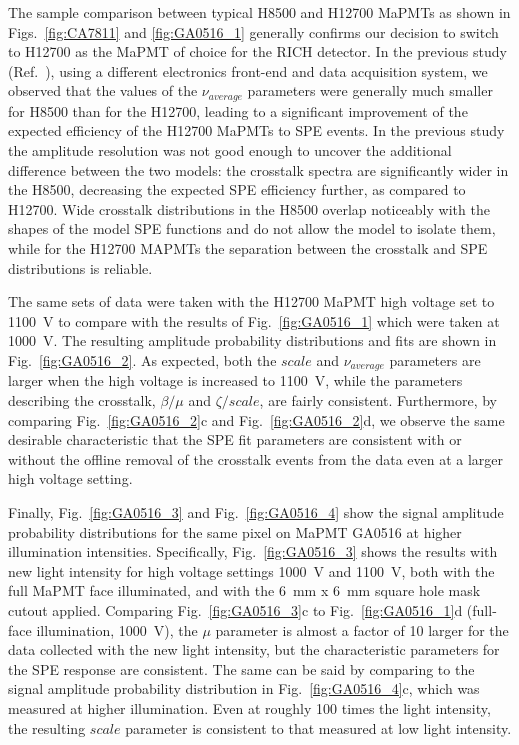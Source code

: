 The sample comparison between typical H8500 and H12700 MaPMTs as shown in Figs.~\ref{fig:CA7811} and \ref{fig:GA0516_1} generally confirms our decision to switch to H12700 as the MaPMT of choice for the RICH detector. In the previous study (Ref.~\cite{DEGTIARENKO20171}), using a different electronics front-end and data acquisition system, we observed that the values of the $\nu_{average}$ parameters were generally much smaller for H8500 than for the H12700, leading to a significant improvement of the expected efficiency of the H12700 MaPMTs to SPE events. In the previous study the amplitude resolution was not good enough to uncover the additional difference between the two models: the crosstalk spectra are significantly wider in the H8500, decreasing the expected SPE efficiency further, as compared to H12700. Wide crosstalk distributions in the H8500 overlap noticeably with the shapes of the model SPE functions and do not allow the model to isolate them, while for the H12700 MAPMTs the separation between the crosstalk and SPE distributions is reliable.  

The same sets of data were taken with the H12700 MaPMT high voltage set to 1100~V to compare with the results of Fig.~\ref{fig:GA0516_1} which were taken at 1000~V. 
The resulting amplitude probability distributions and fits are shown in Fig.~\ref{fig:GA0516_2}. 
As expected, both the $scale$ and $\nu_{average}$ parameters are larger when the high voltage is increased to 1100~V, while the parameters describing the crosstalk, $\beta/\mu$ and $\zeta/scale$, are fairly consistent. 
Furthermore, by comparing Fig.~\ref{fig:GA0516_2}c and Fig.~\ref{fig:GA0516_2}d, we observe the same desirable characteristic that the SPE fit parameters are consistent with or without the offline removal of the crosstalk events from the data even at a larger high voltage setting.


Finally, Fig.~\ref{fig:GA0516_3} and Fig.~\ref{fig:GA0516_4} show the signal amplitude probability distributions for the same pixel on MaPMT GA0516 at higher illumination intensities. 
Specifically, Fig.~\ref{fig:GA0516_3} shows the results with new light intensity for high voltage settings 1000~V and 1100~V, both with the full MaPMT face illuminated, and with the 6~mm x 6~mm square hole mask cutout applied. 
Comparing Fig.~\ref{fig:GA0516_3}c to Fig.~\ref{fig:GA0516_1}d (full-face illumination, 1000~V), the $\mu$ parameter is almost a factor of 10 larger for the data collected with the new light intensity, but the characteristic parameters for the SPE response are consistent. 
The same can be said by comparing to the signal amplitude probability distribution in Fig.~\ref{fig:GA0516_4}c, which was measured at higher illumination.
Even at roughly 100 times the light intensity, the resulting $scale$ parameter is consistent to that measured at low light intensity. 

